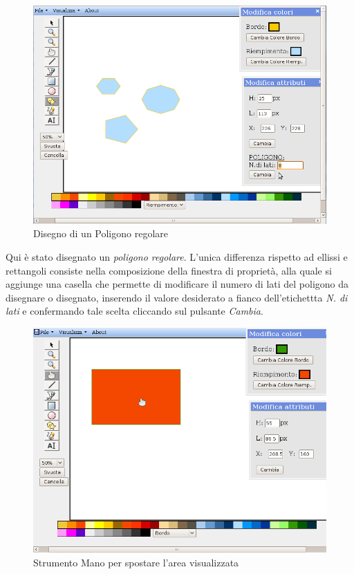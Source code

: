 \begin{figure}[!ht]
\centering
\includegraphics[scale=0.5]{images/poligono.png}
\caption{Disegno di un Poligono regolare}
\end{figure} 

\vspace{300pt}
Qui \`e stato disegnato un \textit{poligono regolare}. L'unica differenza rispetto ad ellissi e rettangoli consiste nella composizione della finestra di propriet\`a, alla quale si aggiunge una casella che permette di modificare il numero di lati del poligono da disegnare o disegnato, inserendo il valore desiderato a fianco dell'etichettta \textit{N. di lati} e confermando tale scelta cliccando sul pulsante \textit{Cambia}.

\begin{figure}[!ht]
\centering
\includegraphics[scale=0.5]{images/mano.png}
\caption{Strumento Mano per spostare l'area visualizzata}
\end{figure} 
\newpage

